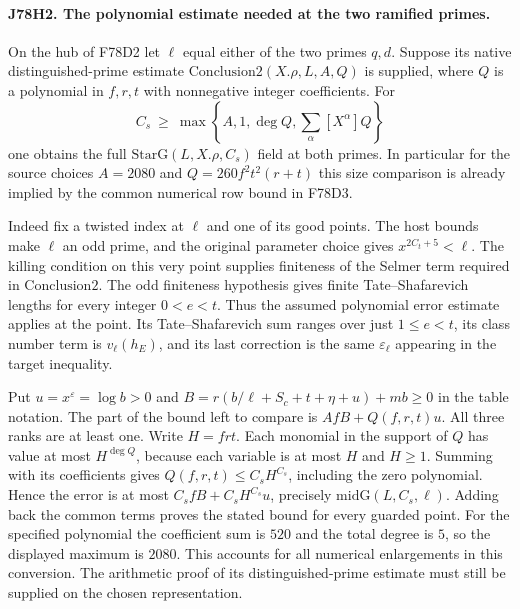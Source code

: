 \paragraph{J78H2. The polynomial estimate needed at the two ramified primes.}
On the hub of F78D2 let $\ell$ equal either of the two primes $q,d$.
Suppose its native distinguished-prime estimate
$\mathrm{Conclusion2}(X.\rho,L,A,Q)$ is supplied, where $Q$ is a
polynomial in $f,r,t$ with nonnegative integer coefficients.
For
\[
 C_s\ \ge\ \max\left\{A,1,\deg Q,\sum_\alpha [X^\alpha]Q\right\}
\]
one obtains the full $\mathrm{StarG}(L,X.\rho,C_s)$ field at both
primes. In particular for the source choices $A=2080$ and
$Q=260 f^2t^2(r+t)$ this size comparison is already implied by
the common numerical row bound in F78D3.

Indeed fix a twisted index at $\ell$ and one of its good points.
The host bounds make $\ell$ an odd prime, and the original parameter
choice gives $x^{2C_t+5}<\ell$. The killing condition on this very
point supplies finiteness of the Selmer term required in
$\mathrm{Conclusion2}$. The odd finiteness hypothesis gives finite
Tate--Shafarevich lengths for every integer $0<e<t$.
Thus the assumed polynomial error estimate applies at the point.
Its Tate--Shafarevich sum ranges over just $1\le e<t$, its class
number term is $v_\ell(h_E)$, and its last correction is the same
$\varepsilon_\ell$ appearing in the target inequality.

Put $u=x^\varepsilon=\log b>0$ and
$B=r(b/\ell+S_c+t+\eta+u)+mb\ge0$ in the table notation.
The part of the bound left to compare is
$AfB+Q(f,r,t)u$. All three ranks are at least one. Write $H=frt$.
Each monomial in the support of $Q$ has value at most $H^{\deg Q}$,
because each variable is at most $H$ and $H\ge1$. Summing with
its coefficients gives $Q(f,r,t)\le C_s H^{C_s}$, including
the zero polynomial. Hence the error is at most
$C_sfB+C_s H^{C_s}u$, precisely $\mathrm{midG}(L,C_s,\ell)$.
Adding back the common terms proves the stated bound for every
guarded point. For the specified polynomial the coefficient sum is
$520$ and the total degree is $5$, so the displayed maximum is
$2080$. This accounts for all numerical enlargements in this
conversion. The arithmetic proof of its distinguished-prime
estimate must still be supplied on the chosen representation.
